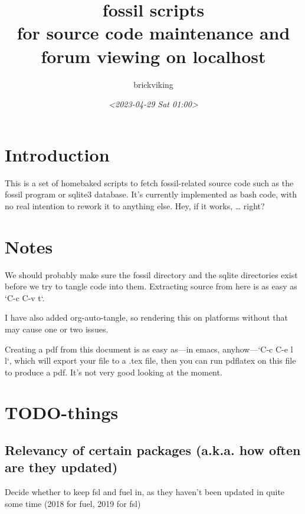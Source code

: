 \documentclass[11pt]{article}
\author{brickviking}
\date{\textit{<2023-04-29 Sat 01:00>}}
\title{fossil scripts\\\medskip
\large for source code maintenance and forum viewing on localhost}
\begin{document}
\maketitle
\setcounter{tocdepth}{2}
\tableofcontents



\section*{Introduction}
\label{sec:orga42943a}

This is a set of homebaked scripts to fetch fossil-related source code such as the fossil program or
sqlite3 database. It's currently implemented as bash code, with no real intention to rework it to
anything else. Hey, if it works, \ldots{} right?

\newpage

\setcounter{tocdepth}{2}
\tableofcontents

\newpage


\section*{Notes}
\label{sec:orgd05a96a}

We should probably make sure the fossil directory and the sqlite directories exist before we try to
tangle code into them. Extracting source from here is as easy as `C-c C-v t`.

I have also added org-auto-tangle, so rendering this on platforms without that may cause one or two
issues.

Creating a pdf from this document is as easy as—in emacs, anyhow—`C-c C-e l l`, which will export
your file to a .tex file, then you can run pdflatex on this file to produce a pdf. It's not very
good looking at the moment.

\section*{TODO-things}
\label{sec:orgbd5103a}

\subsection*{Relevancy of certain packages (a.k.a. how often are they updated)}
\label{sec:orge43b07a}

Decide whether to keep fsl and fuel in, as they haven't been updated in quite some time (2018 for fuel,
2019 for fsl)
\end{document}
